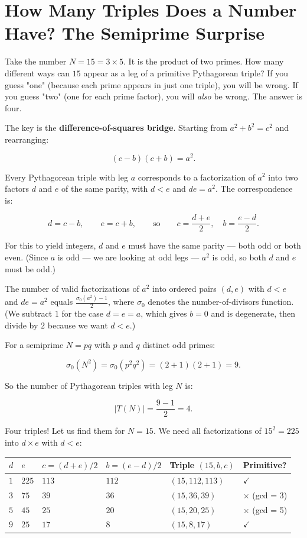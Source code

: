 \ornbreak



\section{How Many Triples Does a Number Have? The Semiprime Surprise}


Take the number $N = 15 = 3 \times 5$. It is the product of two primes. How many different ways can $15$ appear as a leg of a primitive Pythagorean triple? If you guess "one" (because each prime appears in just one triple), you will be wrong. If you guess "two" (one for each prime factor), you will \textit{also} be wrong. The answer is four.

The key is the \textbf{difference-of-squares bridge}. Starting from $a^2 + b^2 = c^2$ and rearranging:

\[
(c - b)(c + b) = a^2.
\]

Every Pythagorean triple with leg $a$ corresponds to a factorization of $a^2$ into two factors $d$ and $e$ of the same parity, with $d < e$ and $de = a^2$. The correspondence is:

\[
d = c - b, \qquad e = c + b, \qquad \text{so} \qquad c = \frac{d + e}{2}, \quad b = \frac{e - d}{2}.
\]

For this to yield integers, $d$ and $e$ must have the same parity --- both odd or both even. (Since $a$ is odd --- we are looking at odd legs --- $a^2$ is odd, so both $d$ and $e$ must be odd.)

The number of valid factorizations of $a^2$ into ordered pairs $(d, e)$ with $d < e$ and $de = a^2$ equals $\frac{\sigma_0(a^2) - 1}{2}$, where $\sigma_0$ denotes the number-of-divisors function. (We subtract $1$ for the case $d = e = a$, which gives $b = 0$ and is degenerate, then divide by $2$ because we want $d < e$.)

For a semiprime $N = pq$ with $p$ and $q$ distinct odd primes:

\[
\sigma_0(N^2) = \sigma_0(p^2 q^2) = (2 + 1)(2 + 1) = 9.
\]

So the number of Pythagorean triples with leg $N$ is:

\[
|T(N)| = \frac{9 - 1}{2} = 4.
\]

Four triples! Let us find them for $N = 15$. We need all factorizations of $15^2 = 225$ into $d \times e$ with $d < e$:

\begin{center}
\small
\begin{tabular}{llllll}
\toprule
$d$ & $e$ & $c = (d+e)/2$ & $b = (e-d)/2$ & Triple $(15, b, c)$ & Primitive? \\
\midrule
$1$ & $225$ & $113$ & $112$ & $(15, 112, 113)$ & $\checkmark$ \\
$3$ & $75$ & $39$ & $36$ & $(15, 36, 39)$ & $\times$ (gcd = 3) \\
$5$ & $45$ & $25$ & $20$ & $(15, 20, 25)$ & $\times$ (gcd = 5) \\
$9$ & $25$ & $17$ & $8$ & $(15, 8, 17)$ & $\checkmark$ \\
\bottomrule
\end{tabular}
\end{center}



